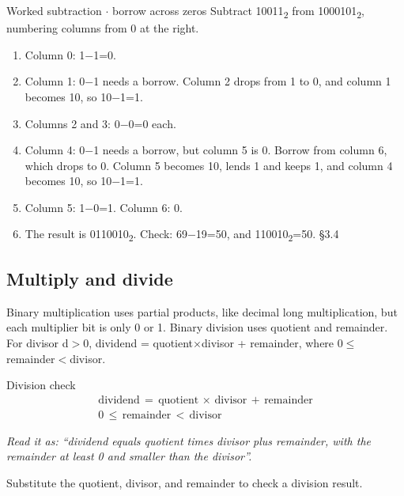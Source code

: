 \documentclass[11pt]{article}
\begin{document}
\begin{keepsection}
\begin{keepsection}
\begin{workedbox}{Worked subtraction \ensuremath{\cdot} borrow across zeros}
Subtract 10011\textsubscript{2} from 1000101\textsubscript{2}, numbering columns from 0 at the right.

\begin{enumerate}
\item Column 0: 1\ensuremath{-}1=0.
\item Column 1: 0\ensuremath{-}1 needs a borrow. Column 2 drops from 1 to 0, and column 1 becomes 10, so 10\ensuremath{-}1=1.
\item Columns 2 and 3: 0\ensuremath{-}0=0 each.
\item Column 4: 0\ensuremath{-}1 needs a borrow, but column 5 is 0. Borrow from column 6, which drops to 0. Column 5 becomes 10, lends 1 and keeps 1, and column 4 becomes 10, so 10\ensuremath{-}1=1.
\item Column 5: 1\ensuremath{-}0=1. Column 6: 0.
\item The result is 0110010\textsubscript{2}. Check: 69\ensuremath{-}19=50, and 110010\textsubscript{2}=50. \hfill{\small\color{FAUblue}§3.4}
\end{enumerate}
\end{workedbox}
\end{keepsection}

\begin{keepsection}
\subsection{Multiply and divide}

Binary multiplication uses partial products, like decimal long multiplication, but each multiplier bit is only 0 or 1. Binary division uses quotient and remainder. For divisor d\ensuremath{>}0, dividend = quotient\ensuremath{\times}divisor + remainder, where 0\ensuremath{\leq}remainder\ensuremath{<}divisor.

\begin{equationcard}{Division check}
\[ \begin{gathered} \text{dividend}\, =\, \text{quotient}\, \times \, \text{divisor}\, +\, \text{remainder} \\ 0\, \leq \, \text{remainder}\, <\, \text{divisor} \end{gathered} \]
{\small \emph{Read it as: “dividend equals quotient times divisor plus remainder, with the remainder at least 0 and smaller than the divisor”.}\par Substitute the quotient, divisor, and remainder to check a division result.}
\end{equationcard}


\end{keepsection}
\end{keepsection}
\end{document}
